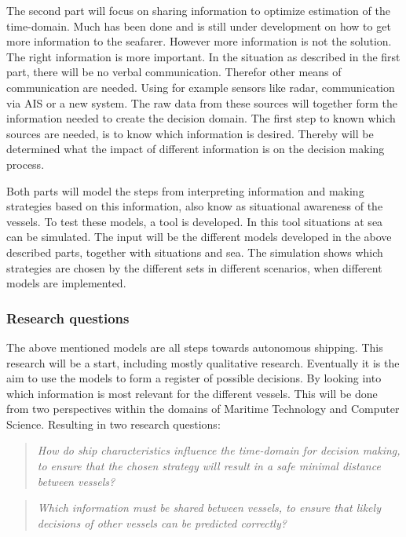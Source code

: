 The second part will focus on sharing information to optimize estimation of the time-domain. Much has been done and is still under development on how to get more information to the seafarer. However more information is not the solution. The right information is more important. In the situation as described in the first part, there will be no verbal communication. Therefor other means of communication are needed. Using for example sensors like radar, communication via AIS or a new system. The raw data from these sources will together form the information needed to create the decision domain. The first step to known which sources are needed, is to know which information is desired. Thereby will be determined what the impact of different information is on the decision making process.

Both parts will model the steps from interpreting information and making strategies based on this information, also know as situational awareness of the vessels. To test these models, a tool is developed. In this tool situations at sea can be simulated. The input will be the different models developed in the above described parts, together with situations and sea. The simulation shows which strategies are chosen by the different sets in different scenarios, when different models are implemented.


\subsubsection*{Research questions}
The above mentioned models are all steps towards autonomous shipping. This research will be a start, including mostly qualitative research. Eventually it is the aim to use the models to form a register of possible decisions. By looking into which information is most relevant for the different vessels. This will be done from two perspectives within the domains of Maritime Technology and Computer Science. Resulting in two research questions:

\begin{quotation}
	\emph{How do ship characteristics influence the time-domain for decision making, to ensure that the chosen strategy will result in a safe minimal distance between vessels?} 
\end{quotation}

\begin{quotation}
	\emph{Which information must be shared between vessels, to ensure that likely decisions of other vessels can be predicted correctly?}
\end{quotation}


